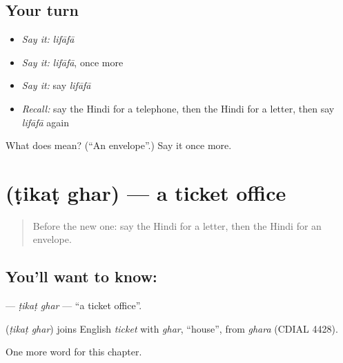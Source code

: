 \subsection*{Your turn}
\begin{itemize}
\raggedright
  \item \emph{Say it:} \emph{lifāfā}
  \item \emph{Say it:} \emph{lifāfā}, once more
  \item \emph{Say it:} say \emph{lifāfā}
  \item \emph{Recall:} say the Hindi for a telephone, then the Hindi for a letter, then say \emph{lifāfā} again
\end{itemize}

\begin{tcolorbox}[breakable,colback=teal!4,colframe=teal!35!black,title={Before you move on}]
What does  mean? (\textquotedblleft{}An envelope\textquotedblright{}.) Say it once more.
\end{tcolorbox}
\section[\texorpdfstring{\hi{टिकट} \hi{घर} (ṭikaṭ ghar)}{टिकट घर (ṭikaṭ ghar)}]{  (ṭikaṭ ghar) — a ticket office}

\label{lesson:HI-C205-tikatghar}



\begin{quote}
Before the new one: say the Hindi for a letter, then the Hindi for an envelope.
\end{quote}

\subsection*{You'll want to know:  }
\textbf{ } — \emph{ṭikaṭ ghar} — \textquotedblleft{}a ticket office\textquotedblright{}.

\begin{cousinweb}
\textbf{ } (\emph{ṭikaṭ ghar}) joins English \emph{ticket} with \emph{ghar}, \textquotedblleft{}house\textquotedblright{}, from \emph{ghara} (CDIAL 4428).
\end{cousinweb}

\begin{grammarlens}[title={What you've built}]
One more word for this chapter.
\end{grammarlens}

